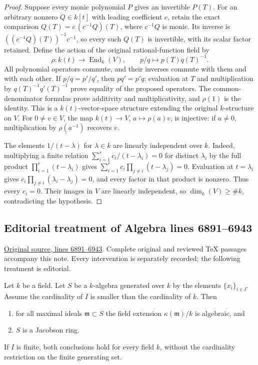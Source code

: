 \begin{proof}
Suppose every monic polynomial $P$ gives an invertible $P(T)$.
For an arbitrary nonzero $Q\in k[t]$ with leading coefficient $c$,
retain the exact comparison
$Q(T)=c\,(c^{-1}Q)(T)$, where $c^{-1}Q$ is monic.
Its inverse is $((c^{-1}Q)(T))^{-1}c^{-1}$, so every such $Q(T)$
is invertible, with its scalar factor retained.
Define the action of the original rational-function field by
$$
\rho:k(t)\longrightarrow\operatorname{End}_k(V),\qquad
p/q\longmapsto p(T)q(T)^{-1}.
$$
All polynomial operators commute, and their inverses commute with
them and with each other. If $p/q=p'/q'$, then $pq'=p'q$;
evaluation at $T$ and multiplication by $q(T)^{-1}q'(T)^{-1}$
prove equality of the proposed operators. The common-denominator
formulas prove additivity and multiplicativity, and $\rho(1)$ is
the identity. This is a $k(t)$-vector-space structure extending
the original $k$-structure on $V$. For $0\ne v\in V$, the map
$k(t)\to V$, $a\mapsto\rho(a)v$, is injective: if $a\ne0$,
multiplication by $\rho(a^{-1})$ recovers $v$.

\medskip\noindent
The elements $1/(t-\lambda)$ for $\lambda\in k$ are linearly
independent over $k$. Indeed, multiplying a finite relation
$\sum_{i=1}^r c_i/(t-\lambda_i)=0$ for distinct $\lambda_i$ by
the full product $\prod_{i=1}^r(t-\lambda_i)$ gives
$\sum_{i=1}^r c_i\prod_{j\ne i}(t-\lambda_j)=0$.
Evaluation at $t=\lambda_i$ gives
$c_i\prod_{j\ne i}(\lambda_i-\lambda_j)=0$, and every factor
in that product is nonzero. Thus every $c_i=0$.
Their images in $V$ are linearly independent, so
$\dim_k(V)\geq\#k$, contradicting the hypothesis.
\end{proof}


\subsection{Editorial treatment of Algebra lines 6891--6943}

\hypertarget{algebra-context-061}{}

\noindent\href{https://github.com/stacks/stacks-project/blob/a04446e57ec1fbc252a871afcec7752fb2807b14/algebra.tex\#L6891}{Original source, lines 6891--6943}. Complete original and reviewed TeX passages accompany this note. Every intervention is separately recorded; the following treatment is editorial.


\begin{theorem}
\label{editorial-source-theorem-uncountable-nullstellensatz}
Let $k$ be a field. Let $S$ be a $k$-algebra generated over $k$
by the elements $\{x_i\}_{i \in I}$. Assume the cardinality of $I$
is smaller than the cardinality of $k$. Then
\begin{enumerate}
\item for all maximal ideals $\mathfrak m \subset S$ the field
extension $\kappa(\mathfrak m)/k$
is algebraic, and
\item $S$ is a Jacobson ring.
\end{enumerate}
If $I$ is finite, both conclusions hold for every field $k$, without
the cardinality restriction on the finite generating set.
\end{theorem}

